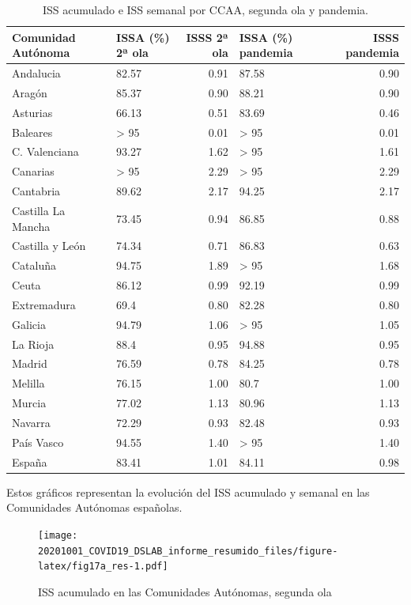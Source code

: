 \documentclass[
  11pt,
]{article}
\begin{document}
\begin{table}[!h]

\caption{\label{tab:tabla}ISS acumulado e ISS semanal por CCAA, segunda ola y pandemia.}
\centering
\fontsize{9}{11}\selectfont
\begin{tabular}[t]{l|l|r|l|r}
\hline
Comunidad Autónoma & ISSA (\%) 2ª ola & ISSS 2ª ola & ISSA (\%) pandemia & ISSS pandemia\\
\hline
Andalucia & 82.57 & 0.91 & 87.58 & 0.90\\
\hline
Aragón & 85.37 & 0.90 & 88.21 & 0.90\\
\hline
Asturias & 66.13 & 0.51 & 83.69 & 0.46\\
\hline
Baleares & > 95 & 0.01 & > 95 & 0.01\\
\hline
C. Valenciana & 93.27 & 1.62 & > 95 & 1.61\\
\hline
Canarias & > 95 & 2.29 & > 95 & 2.29\\
\hline
Cantabria & 89.62 & 2.17 & 94.25 & 2.17\\
\hline
Castilla La Mancha & 73.45 & 0.94 & 86.85 & 0.88\\
\hline
Castilla y León & 74.34 & 0.71 & 86.83 & 0.63\\
\hline
Cataluña & 94.75 & 1.89 & > 95 & 1.68\\
\hline
Ceuta & 86.12 & 0.99 & 92.19 & 0.99\\
\hline
Extremadura & 69.4 & 0.80 & 82.28 & 0.80\\
\hline
Galicia & 94.79 & 1.06 & > 95 & 1.05\\
\hline
La Rioja & 88.4 & 0.95 & 94.88 & 0.95\\
\hline
Madrid & 76.59 & 0.78 & 84.25 & 0.78\\
\hline
Melilla & 76.15 & 1.00 & 80.7 & 1.00\\
\hline
Murcia & 77.02 & 1.13 & 80.96 & 1.13\\
\hline
Navarra & 72.29 & 0.93 & 82.48 & 0.93\\
\hline
País Vasco & 94.55 & 1.40 & > 95 & 1.40\\
\hline
España & 83.41 & 1.01 & 84.11 & 0.98\\
\hline
\end{tabular}
\end{table}

Estos gráficos representan la evolución del ISS acumulado y semanal en
las Comunidades Autónomas españolas.

\vspace{0.2cm}

\begin{figure}
\centering
\texttt{[image: 20201001\_COVID19\_DSLAB\_informe\_resumido\_files/figure-latex/fig17a\_res-1.pdf]}
\caption{\label{fig:fig17a_res} ISS acumulado en las Comunidades
Autónomas, segunda ola}
\end{figure}
\end{document}
